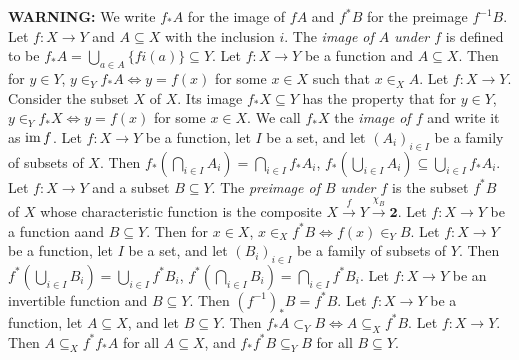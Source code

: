 \linebreak\textbf{WARNING:} We write $f_*A$ for the image of $fA$ and $f^*B$ for the preimage $f^{-1}B$.
 Let $f \colon X \to Y$ and $A \subseteq X$ with the inclusion $i$. The \textit{image of $A$ under $f$} is defined to be $f_*A = \bigcup_{a \in A} \{ fi(a) \} \subseteq Y$.
 Let $f \colon X \to Y$ be a function and $A \subseteq X$. Then for $y \in Y$, $y \in_Y f_*A \iff y = f(x)$ for some $x \in X$ such that $x \in_X A$.
 Let $f \colon X \to Y$. Consider the subset $X$ of $X$. Its image $f_*X \subseteq Y$ has the property that for $y \in Y$, $y \in_Y f_*X \iff y = f(x)$ for some $x \in X$. We call $f_*X$ the \textit{image of $f$} and write it as $\operatorname{im} f$.
 Let $f \colon X \to Y$ be a function, let $I$ be a set, and let $(A_i)_{i \in I}$ be a family of subsets of $X$. Then $f_*(\bigcap_{i \in I} A_i) = \bigcap_{i \in I} f_* A_i$, $f_*(\bigcup_{i \in I} A_i) \subseteq \bigcup_{i \in I} f_* A_i$.
 Let $f \colon X \to Y$ and a subset $B \subseteq Y$. The \textit{preimage of $B$ under $f$} is the subset $f^*B$ of $X$ whose characteristic function is the composite $X \xrightarrow{f} Y \xrightarrow{\chi_B} \mathbf{2}$.
 Let $f \colon X \to Y$ be a function aand $B \subseteq Y$. Then for $x \in X$, $x \in_X f^*B \iff f(x) \in_Y B$.
 Let $f \colon X \to Y$ be a function, let $I$ be a set, and let $(B_i)_{i \in I}$ be a family of subsets of $Y$. Then $f^*(\bigcup_{i \in I} B_i) = \bigcup_{i \in I} f^* B_i$, $f^*(\bigcap_{i \in I} B_i) = \bigcap_{i \in I} f^* B_i$.
 Let $f \colon X \to Y$ be an invertible function and $B \subseteq Y$. Then $(f^{-1})_*B = f^*B$.
 Let $f \colon X \to Y$ be a function, let $A \subseteq X$, and let $B \subseteq Y$. Then $f_*A \subset_Y B \iff A \subseteq_X f^*B$.
 Let $f: X \to Y$. Then $A \subseteq_X f^*f_*A$ for all $A \subseteq X$, and $f_*f^*B \subseteq_Y B$ for all $B \subseteq Y$.

